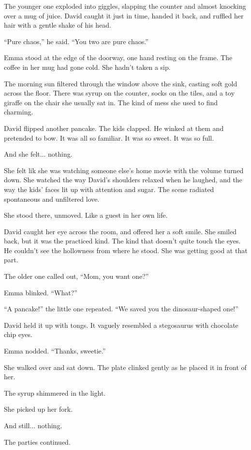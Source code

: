 The younger one exploded into giggles, slapping the counter and almost knocking over a mug of juice.
David caught it just in time, handed it back, and ruffled her hair with a gentle shake of his head.

``Pure chaos,'' he said. ``You two are pure chaos.''

Emma stood at the edge of the doorway, one hand resting on the frame. The coffee in her mug had gone cold. 
She hadn’t taken a sip.

The morning sun filtered through the window above the sink, casting soft gold across the floor. There was 
syrup on the counter, socks on the tiles, and a toy giraffe on the chair she usually sat in. The kind of mess 
she used to find charming. 

David flipped another pancake. The kids clapped. He winked at them and pretended to bow. It was all so familiar. 
It was so sweet. It was so full.

And she felt... nothing.

She felt lik she was watching someone else’s home movie with the volume turned down. She watched the way David’s 
shoulders relaxed when he laughed, and the way the kids’ faces lit up with attention and sugar. The scene 
radiated spontaneous and unfiltered love.

She stood there, unmoved. Like a guest in her own life.

David caught her eye across the room, and offered her a soft smile. She smiled back, but it was the practiced 
kind. The kind that doesn’t quite touch the eyes. He couldn’t see the hollowness from where he stood. She was 
getting good at that part.

The older one called out, ``Mom, you want one?''

Emma blinked. ``What?''

``A pancake!'' the little one repeated. ``We saved you the dinosaur-shaped one!''

David held it up with tongs. It vaguely resembled a stegosaurus with chocolate chip eyes.

Emma nodded. ``Thanks, sweetie.''

She walked over and sat down. The plate clinked gently as he placed it in front of her.

The syrup shimmered in the light.

She picked up her fork.

And still... nothing.

The parties continued.

